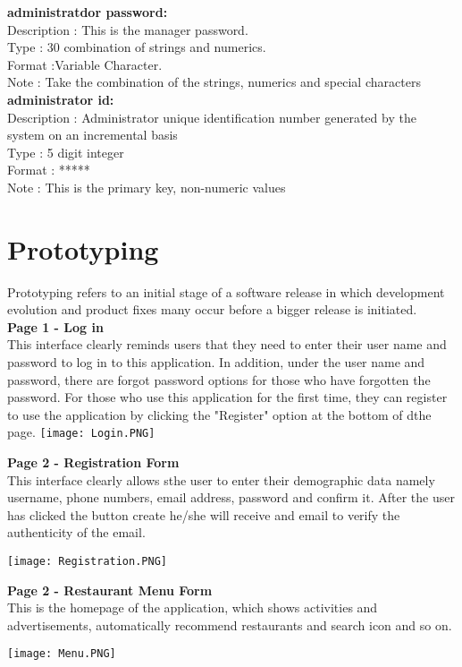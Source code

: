 \documentclass[11pt]{article}
\begin{document}
\textbf {administratdor password:}\\
Description : This is the manager password.\\
Type : 30 combination of strings and numerics. \\
Format :Variable Character. \\
Note : Take the combination of the strings, numerics and special characters\\

\textbf {administrator id:}\\
Description : Administrator unique identification number generated by the system on an incremental basis\\
Type : 5 digit integer \\
Format : ***** \\
Note : This is the primary key, non-numeric values

\section{\Large Prototyping} 
Prototyping refers to an initial stage of a software release in which development evolution and product fixes many occur before a bigger release is initiated.\\

\textbf {\Large Page 1 - Log in}\\
This interface clearly reminds users that they need to enter their user name and password to log in to this application. In addition, under the user name and password, there are forgot password options for those who have forgotten the password. For those who use this application for the first time, they can register to use the application by clicking the "Register" option at the bottom of dthe page.
\texttt{[image: Login.PNG]}

\textbf {\Large Page 2 - Registration Form}\\
This interface clearly allows sthe user to enter their demographic data namely username, phone numbers, email address, password and confirm it. After the user has clicked the button create he/she will receive and email to verify the authenticity of the email.

\texttt{[image: Registration.PNG]}


\textbf {\Large Page 2 - Restaurant Menu Form}\\
This is the homepage of the application, which shows activities and
advertisements, automatically recommend restaurants and search icon and
so on.

\texttt{[image: Menu.PNG]}
\end{document}
